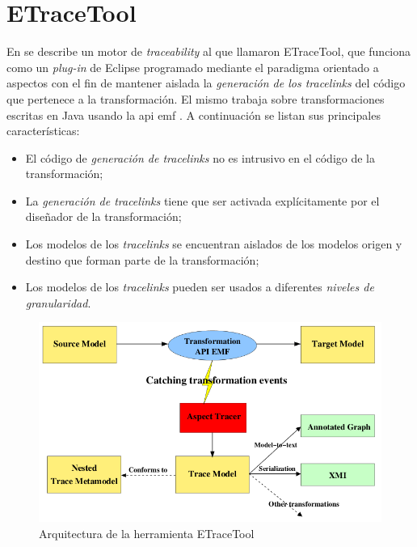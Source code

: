 \documentclass[a4paper,12pt,twoside,spanish,openright]{book}
\begin{document}
\bigskip


\minitoc 


\clearpage


\section{ETraceTool}
\label{sec:ETraceTool}

En \cite{AmarLeblancCoulette} se describe un motor de \textit{traceability} al que llamaron \textsf{ETraceTool}, que funciona como un \textit{plug-in} de \textsf{Eclipse} programado mediante el paradigma orientado a aspectos con el fin de mantener aislada la \textit{generación de los tracelinks} del código que pertenece a la transformación. El mismo trabaja sobre transformaciones escritas en \textsf{Java} usando la \gls{api} \gls{emf} \cite{EMF}. A continuación se listan sus principales características:

\begin{itemize}
\item El código de \textit{generación de tracelinks} no es intrusivo en el código de la transformación;
\item La \textit{generación de tracelinks} tiene que ser activada explícitamente por el diseñador de la transformación;
\item Los modelos de los \textit{tracelinks} se encuentran aislados de los modelos origen y destino que forman parte de la transformación;
\item Los modelos de los \textit{tracelinks} pueden ser usados a diferentes \textit{niveles de granularidad}.
\end{itemize}

\begin{figure}[hbtp]
\centering
\includegraphics[scale=0.55]{./img/ETraceTool_Arquitectura}
\caption{Arquitectura de la herramienta ETraceTool}
\label{fig:ArqETraceTool}
\end{figure}
\end{document}

